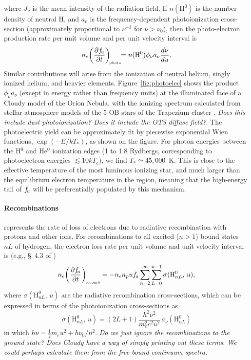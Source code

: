 \documentclass{emulateapj}
\newcommand\hii{\ion{H}{2}}
\begin{document}
where \(J_\nu\)
is the mean intensity of the radiation field.  If \(n(\mathrm{H^0})\)
is the number density of neutral H, and \( a_\nu \)
is the frequency-dependent photoionization cross-section
(approximately proportional to \(\nu^{-3}\)
for \(\nu > \nu_0\)),
then the photo-electron production rate per unit volume and per unit
velocity interval is
\begin{equation}
  \label{eq:6}
  n_e \biggl( \frac{\partial f_{\!u}}{\partial t} \biggr)_{\!\scriptscriptstyle\mathrm{photo}} \!\! = n(\mathrm{H^0})  \phi_\nu a_\nu \frac{d\nu}{d u} . 
\end{equation}
Similar contributions will arise from the ionization of neutral
helium, singly ionized helium, and heavier elements.
Figure~\ref{fig:photoelec} shows the product \(\phi_\nu a_\nu\)
(except in energy rather than frequency units) at the illuminated face
of a Cloudy model of the Orion Nebula, with the ionizing spectrum
calculated from stellar atmosphere models \citep{2003ApJS..146..417L}
of the 5 OB stars of the Trapezium cluster \citep{Ferland:2012a}.
\emph{Does this include dust photoionization?  Does it include the OTS
diffuse field?}.  The photoelectric
yield can be approximately fit by piecewise exponential Wien
functions, \(\exp(-E/k T_*)\),
as shown on the figure.  For photon energies between the H\(^0\)
and He\(^0\)
ionization edges (1 to 1.8 Rydbergs, corresponding to photoelectron
energies \(\lesssim 10 k T_e\)),
we find \(T_* \simeq 45,000\)~K\@.
This is close to the effective temperature of the most luminous
ionizing star, and much larger than the equilibrium electron
temperature in the \hii{} region, meaning that the high-energy tail of
\(f_{\!u}\) will be preferentially populated by this mechanism.

\paragraph{Recombinations}  represents the rate of loss
of electrons due to radiative recombination with protons and other
ions.  For recombinations to all excited (\(n > 1\))
bound states \(nL\)
of hydrogen, the electron loss rate per unit volume and unit velocity
interval is (e.g., \S~4.3 of \citealp{Ferland:2012a})
\begin{equation}
  \label{eq:11}
  n_e \biggl( \frac{\partial f_{\!u}}{\partial t} \biggr)_{\!\scriptscriptstyle\mathrm{recomb}} = -n_e n_p u f_{\!u} \sum_{n=2}^\infty \sum_{L=0}^{n-1} \sigma(\mathrm{H}^0_{nL},\, u),  
\end{equation}
where \(\sigma(\mathrm{H}^0_{nL},\, u)\) are the radiative recombination
cross-sections, which can be expressed in terms of the photoionization
cross-sections as 
\begin{equation}
  \label{eq:5}
  \sigma(\mathrm{H}^0_{nL},\, u) = (2 L + 1) \frac{h^2 \nu^2}{m_e^2 c^2 u^2} \, a_\nu(\mathrm{H}^0_{nL})
\end{equation}
in which \(h\nu = \frac12 m_e u^2 + h\nu_0/n^2\). 
\textit{Do we just ignore the recombinations to the ground state?
  Does Cloudy have a way of simply printing out these terms.  We could
  perhaps calculate them from the free-bound continuum spectra.}
\end{document}
